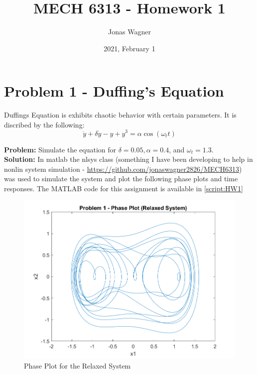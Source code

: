 \documentclass[letter]{article}
\title{MECH 6313 - Homework 1}
\author{Jonas Wagner}
\date{2021, February 1}
\begin{document}
\maketitle


\section{Problem 1 - Duffing's Equation}
Duffings Equation is exhibits chaotic behavior with certain parameters. It is discribed by the following:
\begin{displaymath}
	\ddot{y} + \delta \dot{y} - y + y^3 = \alpha \cos(\omega_t t)
\end{displaymath}

\textbf{Problem:}
Simulate the equation for $\delta = 0.05, \alpha = 0.4$, and $\omega_t = 1.3$.\\

\textbf{Solution:}
In matlab the nlsys class (something I have been developing to help in nonlin system simulation - \href{https://github.com/jonaswagner2826/MECH6313}{https://github.com/jonaswagner2826/MECH6313}) was used to simulate the system and plot the following phase plots and time responses. The MATLAB code for this assignment is available in \appendixname \ref{script:HW1}\\



\begin{figure}[h]
	\centering
	\includegraphics[width=0.7\linewidth]{fig/pblm1_phase}
	\caption{Phase Plot for the Relaxed System}
	\label{fig:pblm1phase}
\end{figure}
\end{document}
